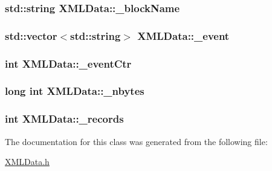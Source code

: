 \subsubsection[{\texorpdfstring{\+\_\+block\+Name}{_blockName}}]{\setlength{\rightskip}{0pt plus 5cm}std\+::string X\+M\+L\+Data\+::\+\_\+block\+Name\hspace{0.3cm}{\ttfamily [protected]}}\hypertarget{classXMLData_af2100a3d690087205daa728d1e1e93f8}{}\label{classXMLData_af2100a3d690087205daa728d1e1e93f8}
\subsubsection[{\texorpdfstring{\+\_\+event}{_event}}]{\setlength{\rightskip}{0pt plus 5cm}std\+::vector$<$std\+::string$>$ X\+M\+L\+Data\+::\+\_\+event\hspace{0.3cm}{\ttfamily [protected]}}\hypertarget{classXMLData_a56529a9696113e52d999e0ec06a7518e}{}\label{classXMLData_a56529a9696113e52d999e0ec06a7518e}
\subsubsection[{\texorpdfstring{\+\_\+event\+Ctr}{_eventCtr}}]{\setlength{\rightskip}{0pt plus 5cm}int X\+M\+L\+Data\+::\+\_\+event\+Ctr\hspace{0.3cm}{\ttfamily [protected]}}\hypertarget{classXMLData_a07f720693c1142a662d03e0b9e4e4a08}{}\label{classXMLData_a07f720693c1142a662d03e0b9e4e4a08}
\subsubsection[{\texorpdfstring{\+\_\+nbytes}{_nbytes}}]{\setlength{\rightskip}{0pt plus 5cm}long int X\+M\+L\+Data\+::\+\_\+nbytes\hspace{0.3cm}{\ttfamily [protected]}}\hypertarget{classXMLData_a25fa9065737de2504d3941c4a36a456e}{}\label{classXMLData_a25fa9065737de2504d3941c4a36a456e}
\subsubsection[{\texorpdfstring{\+\_\+records}{_records}}]{\setlength{\rightskip}{0pt plus 5cm}int X\+M\+L\+Data\+::\+\_\+records\hspace{0.3cm}{\ttfamily [protected]}}\hypertarget{classXMLData_a56bb09b671afb05abefff1406070a7a3}{}\label{classXMLData_a56bb09b671afb05abefff1406070a7a3}


The documentation for this class was generated from the following file\+:\begin{DoxyCompactItemize}
\item 
\hyperlink{XMLData_8h}{X\+M\+L\+Data.\+h}\end{DoxyCompactItemize}
